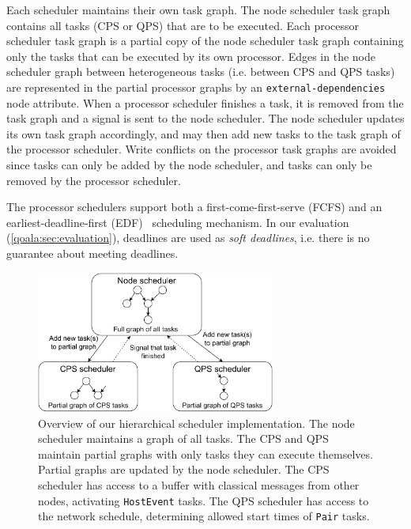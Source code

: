 Each scheduler maintains their own task graph.
The node scheduler task graph contains all tasks (CPS or QPS) that are to be executed.
Each processor scheduler task graph is a partial copy of the node scheduler task graph containing only the tasks that can be executed by its own processor.
Edges in the node scheduler graph between heterogeneous tasks (i.e. between CPS and QPS tasks) are represented in the partial processor graphs by an \texttt{external-dependencies} node attribute. 
When a processor scheduler finishes a task, it is removed from the task graph and a signal is sent to the node scheduler.
The node scheduler updates its own task graph accordingly, and may then add new tasks to the task graph of the processor scheduler.
Write conflicts on the processor task graphs are avoided since tasks can only be added by the node scheduler, and tasks can only be removed by the processor scheduler.

The processor schedulers support both a first-come-first-serve (FCFS) and an earliest-deadline-first (EDF)~\cite{silberschatz2006operating} scheduling mechanism.
In our evaluation (\cref{qoala:sec:evaluation}), deadlines are used as \textit{soft deadlines}, i.e. there is no guarantee about meeting deadlines.

\begin{figure}
    \centering
    \includegraphics[width=0.7\textwidth]{figures/qoala/scheduler_components.pdf}
    \caption{Overview of our hierarchical scheduler implementation.
    The node scheduler maintains a graph of all tasks. The CPS and QPS maintain partial graphs with only tasks they can execute themselves. Partial graphs are updated by the node scheduler. 
    The CPS scheduler has access to a buffer with classical messages from other nodes, activating \texttt{HostEvent} tasks. The QPS scheduler has access to the network schedule, determining allowed start times of \texttt{Pair} tasks.}
    \label{qoala:fig:scheduler_impl}
\end{figure}





